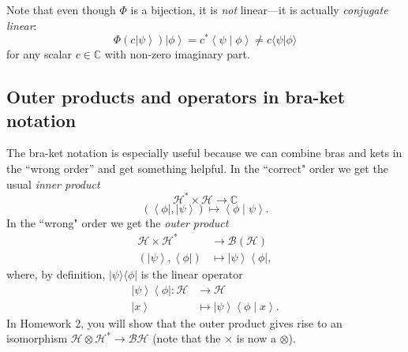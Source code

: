 \documentclass{article}
\newcommand{\braket}[2]{\langle#1|#2\rangle}
\newcommand{\ketbra}[2]{|#1\rangle\langle #2|}
\newcommand{\bbC}{\mathbb{C}}
\newcommand{\calH}{\mathcal{H}}
\begin{document}
Note that even though $\Phi$ is a bijection, it is \emph{not} linear---it is actually \emph{conjugate linear}: 
\[
\Phi (c \left| \psi \right\rangle ) \left| \phi \right\rangle = c^* \left\langle \psi \middle| \phi \right\rangle \ne c \braket{\psi}{\phi} \] 
for any scalar $c \in \bbC$ with non-zero imaginary part.

\subsection{Outer products and operators in bra-ket notation}

The bra-ket notation is especially useful because we can combine bras and kets in the ``wrong order'' and get something helpful. In the ``correct" order we get the usual \textit{inner product}
\[
	\mathscr{H}^* \times \mathscr{H} \to  \mathbb{C}
\] 
\[
	\left( \left\langle \phi \right| , \left| \psi \right\rangle  \right)  \mapsto \left\langle \phi \middle| \psi \right\rangle 
.\] 
In the ``wrong" order we get the \textit{outer product}
\begin{align*}
	\mathscr{H} \times  \mathscr{H}^* &\longrightarrow \mathcal{B}(\mathscr{H}) \\
	\left( \left| \psi \right\rangle , \left\langle \phi \right|   \right)  &\longmapsto \left| \psi \right\rangle \left\langle \phi \right| ,
\end{align*}
where, by definition, $\ketbra{\psi}{\phi}$ is the linear operator
\begin{align*}
	\left| \psi \right\rangle \left\langle \phi \right| : \mathscr{H} &\longrightarrow \mathscr{H} \\
	\left| x \right\rangle  &\longmapsto \left| \psi \right\rangle \left\langle \phi \middle| x \right\rangle 
.\end{align*}
In Homework 2, you will show that the outer product gives rise to an isomorphism $\calH \otimes \calH^* \to \mathcal{B}{\calH}$ (note that the $\times$ is now a $\otimes$).
\end{document}
